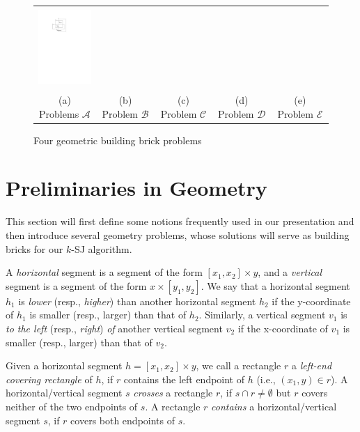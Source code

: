 \documentclass[sigconf]{acmart}
\def\vgap{\vspace{0mm}}
\def\extraspacing{\vspace{1.5mm} \noindent}
\def\figcapup{\vspace{-2mm}}
\def\figcapdown{\vspace{-2mm}}
\begin{document}
\begin{figure}
\begin{tabular}{ccccc}
        \hspace{3mm}
        \includegraphics[height=30mm]{./artwork/prob-e} \\[2mm]
        (a) Problems $\mathscr{A}$ &
        \hspace{3mm}
        (b) Problem $\mathscr{B}$ &
        \hspace{3mm}
        (c) Problem $\mathscr{C}$ &
        \hspace{3mm}
        (d) Problem $\mathscr{D}$ &
        \hspace{3mm}
        (e) Problem $\mathscr{E}$
    \end{tabular}

    \figcapup
    \caption{Four geometric building brick problems}
    \label{fig:probs}
    \figcapdown
\end{figure}

\section{Preliminaries in Geometry} \label{sec:bricks}

This section will first define some notions frequently used in our presentation and then introduce several  geometry problems, whose solutions will serve as building bricks for our $k$-SJ algorithm.

\extraspacing {\bf Terminology.} A {\em horizontal} segment is a segment of the form $[x_1, x_2] \times y$, and a {\em vertical} segment is a segment of the form $x \times [y_1, y_2]$. We say that a horizontal segment $h_1$ is {\em lower} (resp., {\em higher}) than another horizontal segment $h_2$ if the y-coordinate of $h_1$ is smaller (resp., larger) than that of $h_2$. Similarly, a vertical segment $v_1$ is {\em to the left} (resp., {\em right}) {\em of} another vertical segment $v_2$ if the x-coordinate of $v_1$ is smaller (resp., larger) than that of $v_2$.

\vgap


Given a horizontal segment $h = [x_1, x_2] \times y$, we call a rectangle $r$ a {\em left-end covering rectangle} of $h$, if $r$ contains the left endpoint of $h$ (i.e., $(x_1, y) \in r$). A horizontal/vertical segment $s$ {\em crosses} a rectangle $r$, if $s \cap r \ne \emptyset$ but $r$ covers neither of the two endpoints of $s$. A rectangle $r$ {\em contains} a horizontal/vertical segment $s$, if $r$ covers both endpoints of $s$.
\end{document}
